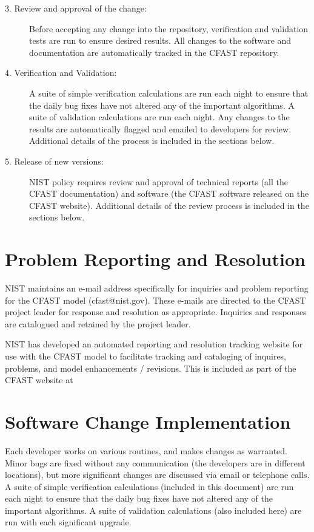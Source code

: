 \documentclass[12pt]{book}
\begin{document}
\begin{description}
\item [3. Review and approval of the change:] Before accepting any change into the repository, verification and validation tests are run to ensure desired results. All changes to the software and documentation are automatically tracked in the CFAST repository.
\item [4. Verification and Validation:] A suite of simple verification calculations are run each night to ensure that the daily bug fixes have not altered any of the important algorithms. A suite of validation calculations are run each night. Any changes to the results are automatically flagged and emailed to developers for review. Additional details of the process is included in the sections below.
\item [5. Release of new versions:] NIST policy requires review and approval of technical reports (all the CFAST documentation) and software (the CFAST software released on the CFAST website). Additional details of the review process is included in the sections below.
\end{description}

\section{Problem Reporting and Resolution}

NIST maintains an e-mail address specifically for inquiries and problem reporting for the CFAST model (cfast@nist.gov).  These e-mails are directed to the CFAST project leader for response and resolution as appropriate.  Inquiries and responses are catalogued and retained by the project leader.

NIST has developed an automated reporting and resolution tracking website for use with the CFAST model to facilitate tracking and cataloging of inquires, problems, and model enhancements / revisions. This is included as part of the CFAST website at \newline
\href{https://github.com/firemodels/cfast/issues}{}

\section{Software Change Implementation}

Each developer works on various routines, and makes changes as warranted. Minor bugs are fixed without any communication (the developers are in different locations), but more significant changes are discussed via email or telephone calls. A suite of simple verification calculations (included in this document) are run each night to ensure that the daily bug fixes have not altered any of the important algorithms. A suite of validation calculations (also included here) are run with each significant upgrade.
\end{document}
